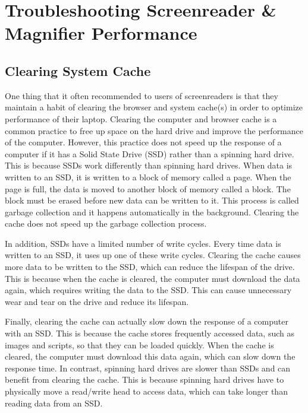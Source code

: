 \hypertarget{troubleshooting}{}\chapter[\hfill\break\raggedright Troubleshooting Screenreader \& Magnifier Performance]{Troubleshooting Screenreader \& Magnifier Performance}\label{troubleshooting}
\noindent\makebox[\linewidth]{\rule{\linewidth}{0.4pt}}
{\let\clearpage\relax\localtableofcontents}\newpage
\hypertarget{cache}{}\section{Clearing System Cache}\label{cache}
One thing that it often recommended to users of screenreaders is that they maintain a habit of clearing the browser and system cache(s) in order to optimize performance of their laptop. Clearing the computer and browser cache is a common practice to free up space on the hard drive and improve the performance of the computer. However, this practice does not speed up the response of a computer if it has a Solid State Drive (SSD) rather than a spinning hard drive. This is because SSDs work differently than spinning hard drives. When data is written to an SSD, it is written to a block of memory called a page. When the page is full, the data is moved to another block of memory called a block. The block must be erased before new data can be written to it. This process is called garbage collection and it happens automatically in the background. Clearing the cache does not speed up the garbage collection process.

In addition, SSDs have a limited number of write cycles. Every time data is written to an SSD, it uses up one of these write cycles. Clearing the cache causes more data to be written to the SSD, which can reduce the lifespan of the drive. This is because when the cache is cleared, the computer must download the data again, which requires writing the data to the SSD. This can cause unnecessary wear and tear on the drive and reduce its lifespan.

Finally, clearing the cache can actually slow down the response of a computer with an SSD. This is because the cache stores frequently accessed data, such as images and scripts, so that they can be loaded quickly. When the cache is cleared, the computer must download this data again, which can slow down the response time. In contrast, spinning hard drives are slower than SSDs and can benefit from clearing the cache. This is because spinning hard drives have to physically move a read/write head to access data, which can take longer than reading data from an SSD.

